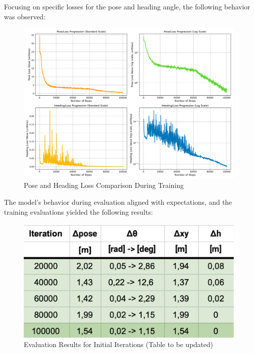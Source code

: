 Focusing on specific losses for the pose and heading angle, the following behavior was observed:

\begin{figure}[H]
    \centering
    \includegraphics[width=1\linewidth]{LateX//figs/mse_pose_heading_loss_comparison.png}
    \caption{Pose and Heading Loss Comparison During Training}
    \label{fig:pose-heading-loss}
\end{figure}

The model's behavior during evaluation aligned with expectations, and the training evaluations yielded the following results:

\begin{figure}[H]
    \centering
    \includegraphics[width=0.75\linewidth]{LateX//figs/tabella_iteration1.png}
    \caption{Evaluation Results for Initial Iterations (Table to be updated)}
    \label{fig:evaluation-results}
\end{figure}

